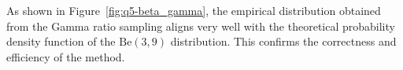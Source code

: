 As shown in Figure~\ref{fig:q5-beta_gamma}, the empirical distribution obtained from the Gamma ratio sampling aligns very well with the theoretical probability density function of the $\text{Be}(3, 9)$ distribution. This confirms the correctness and efficiency of the method.









